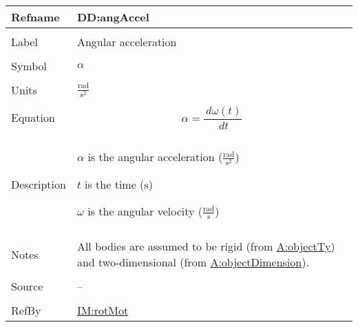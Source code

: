 \documentclass[12pt]{article}
\begin{document}
\vspace{\baselineskip}
\noindent
\begin{minipage}{\textwidth}
\begin{tabular}{>{\raggedright}p{}>{\raggedright\arraybackslash}p{}}
\toprule \textbf{Refname} & \textbf{DD:angAccel}
\label{DD:angAccel}
\\ \midrule \\
Label & Angular acceleration
        
\\ \midrule \\
Symbol & $α$
         
\\ \midrule \\
Units & $\frac{\text{rad}}{\text{s}^{2}}$
        
\\ \midrule \\
Equation & \begin{displaymath}
           α=\frac{\,dω\left(t\right)}{\,dt}
           \end{displaymath}
\\ \midrule \\
Description & \begin{symbDescription}
              \item{$α$ is the angular acceleration ($\frac{\text{rad}}{\text{s}^{2}}$)}
              \item{$t$ is the time (${\text{s}}$)}
              \item{$ω$ is the angular velocity ($\frac{\text{rad}}{\text{s}}$)}
              \end{symbDescription}
\\ \midrule \\
Notes & All bodies are assumed to be rigid (from \hyperref[assumpOT]{A:objectTy}) and two-dimensional (from \hyperref[assumpOD]{A:objectDimension}).
        
\\ \midrule \\
Source & --
         
\\ \midrule \\
RefBy & \hyperref[IM:rotMot]{IM:rotMot}
        
\\ \bottomrule
\end{tabular}
\end{minipage}
\end{document}
